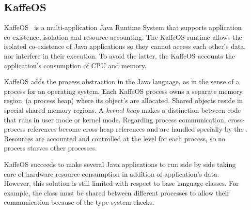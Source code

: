 \subsection*{KaffeOS}

KaffeOS~\cite{Back00a} is a multi-application Java Runtime System that supports application co-existence, isolation and resource accounting. The KaffeOS runtime allows the isolated co-existence of Java applications so they cannot access each other's data, nor interfere in their execution. To avoid the latter, the KaffeOS \VM accounts the application's consumption of CPU and memory.

KaffeOS adds the process abstraction in the Java language, as in the sense of a process for an operating system. Each KaffeOS process owns a separate memory region~(a process heap) where its object's are allocated. Shared objects reside in special shared memory regions. A \emph{kernel heap} makes a distinction between code that runs in user mode or kernel mode. Regarding process communication, cross-process references become cross-heap references and are handled specially by the \VM. Resources are accounted and controlled at the \VM level for each process, so no process starves other processes.

KaffeOS succeeds to make several Java applications to run side by side taking care of hardware resource consumption in addition of application's data. However, this solution is still limited with respect to base language classes. For example, the class  must be shared between different processes to allow their communication because of the type system checks.

%


